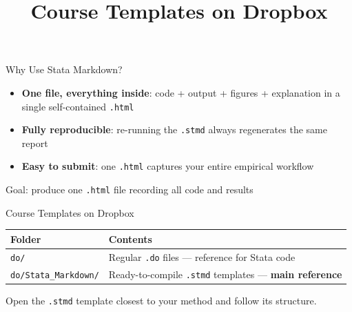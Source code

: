 \documentclass[dvipsnames,hyperref={pdfpagelabels=false}]{beamer}
\begin{document}
\begin{frame}{Why Use Stata Markdown?}
  \begin{itemize}
    \item \textbf{One file, everything inside}: code + output + figures + explanation
          in a single self-contained \texttt{.html}
    \item \textbf{Fully reproducible}: re-running the \texttt{.stmd} always regenerates
          the same report
    \item \textbf{Easy to submit}: one \texttt{.html} captures your entire empirical
          workflow
  \end{itemize}

  \vspace{1em}
  \begin{center}
    \alert{Goal: produce one \texttt{.html} file recording all code and results}
  \end{center}
\end{frame}

\title[]{Course Templates on Dropbox}
\author{}\institute{}\date{}
\begin{frame}{}
  \titlepage
\end{frame}

\begin{frame}{Course Templates on Dropbox}
  \begin{center}
    \begin{tabular}{ll}
      \toprule
      \textbf{Folder} & \textbf{Contents} \\
      \midrule
      \texttt{do/} & Regular \texttt{.do} files --- reference for Stata code \\
      \texttt{do/Stata\_Markdown/} & Ready-to-compile \texttt{.stmd} templates --- \textbf{main reference} \\
      \bottomrule
    \end{tabular}
  \end{center}

  \vspace{1em}
  Open the \texttt{.stmd} template closest to your method and follow its structure.
\end{frame}
\end{document}

